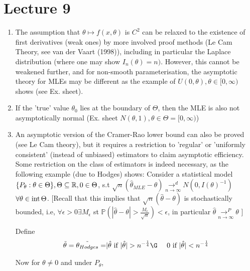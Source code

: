 \documentclass[a4paper]{article}
\begin{document}
\section*{Lecture 9}

\begin{remark}
	\begin{enumerate}
		\item The assumption that $\theta \mapsto f(x,\theta)$ is $C^2$ can be relaxed to the existence of first derivatives (weak ones) by more involved proof methods (Le Cam Theory, see van der Vaart (1998)), including in particular the Laplace distribution (where one may show $I_n(\theta) = n)$. However, this cannot be weakened further, and for non-smooth parameterisation, the asymptotic theory for MLEs may be different as the example of $U(0, \theta), \theta \in [0,\infty)$ shows (see Ex. sheet).

		\item If the 'true' value $\theta_0$ lies at the boundary of $\Theta$, then the MLE is also not asymptotically normal (Ex. sheet $N(\theta, 1), \theta \in \Theta = [0, \infty) $)

		\item An asymptotic version of the Cramer-Rao lower bound can also be proved (see Le Cam theory), but it requires a restriction to 'regular' or 'uniformly consistent' (instead of unbiased) estimators to claim asymptotic efficiency. Some restriction on the class of estimators is indeed necessary, as the following example (due to Hodges) shows:
			Consider a statistical model $\{P_{\theta} : \theta \in \Theta \}, \Theta \subseteq \mathbb{R}, 0 \in  \Theta$, s.t $\sqrt{n}(\hat{\theta}_{MLE} - \theta) \underset{n \to \infty}{\to ^{d}} N(0, I(\theta)^{-1})$ $ \forall \theta \in\operatorname{int}\Theta$. [Recall that this implies that $\sqrt{n}(\hat{\theta} - \theta) $ is stochastically bounded, i.e, $\forall \epsilon > 0 \exists M_{\epsilon}$ st $\mathbb{P}\left( |\hat{\theta} - \theta| > \frac{M_{\epsilon}}{\sqrt{n} } \right) < \epsilon$, in particular $\hat{\theta} \underset{n\to \infty}{\to ^{P}} \theta$ ]

			Define  \begin{align*}
				\tilde{\theta}=\tilde{\theta_{Hodges}} =  \mid &\hat{\theta} \text{ if } |\hat{\theta}| > n^{- \frac{1}{4}} \G\
				&0 \text{ if } |\hat{\theta}| < n^{- \frac{1}{4}}
		\end{align*} 

		Now for $\theta \neq 0$ and under $P_\theta$,


\end{enumerate}
\end{remark}
\end{document}
